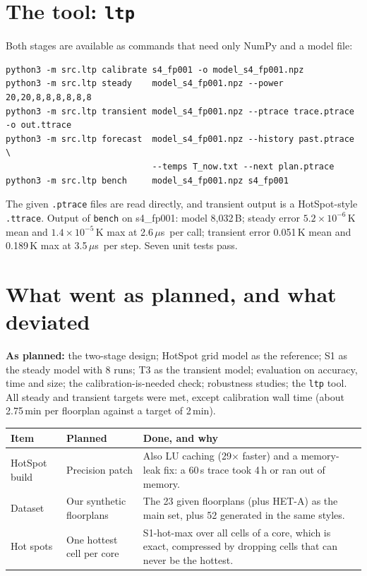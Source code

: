 \documentclass[11pt,a4paper]{article}
\newcommand{\us}{\,$\mu$s}
\begin{document}
\section{The tool: \texttt{ltp}}
Both stages are available as commands that need only NumPy and a model file:
{\small\begin{verbatim}
python3 -m src.ltp calibrate s4_fp001 -o model_s4_fp001.npz
python3 -m src.ltp steady    model_s4_fp001.npz --power 20,20,8,8,8,8,8,8
python3 -m src.ltp transient model_s4_fp001.npz --ptrace trace.ptrace -o out.ttrace
python3 -m src.ltp forecast  model_s4_fp001.npz --history past.ptrace \
                             --temps T_now.txt --next plan.ptrace
python3 -m src.ltp bench     model_s4_fp001.npz s4_fp001
\end{verbatim}}
The given \texttt{.ptrace} files are read directly, and transient output is a HotSpot-style
\texttt{.ttrace}. Output of \texttt{bench} on s4\_fp001: model 8{,}032\,B; steady error
$5.2\times10^{-6}$\,K mean and $1.4\times10^{-5}$\,K max at 2.6\us\ per call; transient error
0.051\,K mean and 0.189\,K max at 3.5\us\ per step. Seven unit tests pass.

\section{What went as planned, and what deviated}
\textbf{As planned:} the two-stage design; HotSpot grid model as the reference; S1 as the steady
model with 8 runs; T3 as the transient model; evaluation on accuracy, time and size; the
calibration-is-needed check; robustness studies; the \texttt{ltp} tool. All steady and transient
targets were met, except calibration wall time (about 2.75\,min per floorplan against a target of
2\,min).

\begin{center}
\small
\begin{tabular}{@{}p{3cm} p{4.3cm} p{7.7cm}@{}}
\toprule
Item & Planned & Done, and why \\
\midrule
HotSpot build & Precision patch & Also LU caching (29$\times$ faster) and a memory-leak fix: a 60\,s trace took 4\,h or ran out of memory. \\
Dataset & Our synthetic floorplans & The 23 given floorplans (plus HET-A) as the main set, plus 52 generated in the same styles. \\
Hot spots & One hottest cell per core & S1-hot-max over all cells of a core, which is exact, compressed by dropping cells that can never be the hottest. \\
\bottomrule
\end{tabular}
\end{center}
\end{document}
